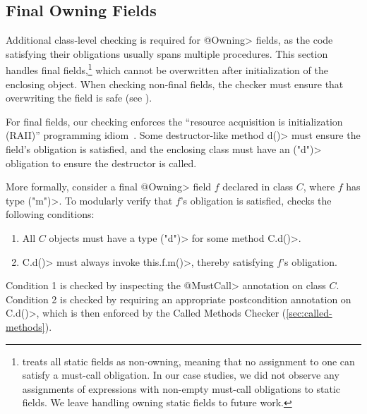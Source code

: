 

\subsection{Final Owning Fields}
\label{sec:owning-fields}

  Additional class-level checking is required for \<@Owning>
  fields, as the code
  satisfying their \MustCall obligations usually spans multiple
  procedures.  This section handles final fields,\footnote{\Tool
    treats all static fields as non-owning, meaning that no assignment to one
    can satisfy a must-call obligation. In our case studies, we did
    not observe any assignments of expressions with non-empty must-call obligations
    to static fields. We leave handling owning static fields to future work.
  }
  which cannot be overwritten after initialization of the enclosing
  object.  When checking
  non-final fields, the checker must ensure
  that overwriting the field is safe
  (see ).

  For final fields, our checking enforces the ``resource acquisition is
  initialization (RAII)'' programming idiom~\cite{raii}.  Some
  destructor-like method \<d()> must ensure the field's \MustCall obligation is
  satisfied, and the enclosing class must have an \MustCall\<("d")> obligation to
  ensure the destructor is called.

  More formally, consider a final \<@Owning> field $f$ declared in class $C$,
  where
  $f$ has type \MustCall\<("m")>.  To modularly
  verify that $f$'s \MustCall obligation is satisfied, \tool checks the following
  conditions:
  \begin{enumerate}
    \item All $C$ objects must have a type \MustCall\<("d")> for some method \<C.d()>.
    \item \<C.d()> must always invoke \<this.f.m()>, thereby satisfying $f$'s
    \MustCall obligation.
  \end{enumerate}
  Condition 1 is checked by inspecting the \<@MustCall> annotation on class $C$.
  Condition 2 is checked by requiring an appropriate \EnsuresCalledMethods
  postcondition annotation on \<C.d()>, which is then enforced by the Called
  Methods Checker (\cref{sec:called-methods}).



